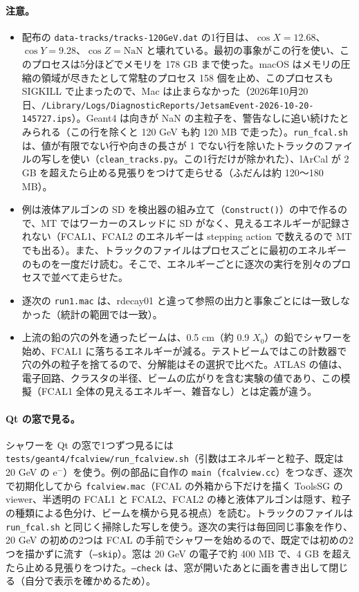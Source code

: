 \documentclass[a4paper,10pt]{ltjsarticle}
\begin{document}
\paragraph{注意。}
\begin{itemize}
\item 配布の \texttt{data-tracks/tracks-120GeV.dat} の1行目は、$\cos X=12.68$、$\cos Y=9.28$、$\cos Z=\mathrm{NaN}$ と壊れている。最初の事象がこの行を使い、このプロセスは5分ほどでメモリを 178 GB まで使った。macOS はメモリの圧縮の領域が尽きたとして常駐のプロセス 158 個を止め、このプロセスも SIGKILL で止まったので、Mac は止まらなかった（2026年10月20日、\nolinkurl{/Library/Logs/DiagnosticReports/JetsamEvent-2026-10-20-145727.ips}）。Geant4 は向きが NaN の主粒子を、警告なしに追い続けたとみられる（この行を除くと 120 GeV も約 120 MB で走った）。\texttt{run\_fcal.sh} は、値が有限でない行や向きの長さが 1 でない行を除いたトラックのファイルの写しを使い（\texttt{clean\_tracks.py}。この1行だけが除かれた）、lArCal が 2 GB を超えたら止める見張りをつけて走らせる（ふだんは約 120〜180 MB）。
\item 例は液体アルゴンの SD を検出器の組み立て（\texttt{Construct()}）の中で作るので、MT ではワーカーのスレッドに SD がなく、見えるエネルギーが記録されない（FCAL1、FCAL2 のエネルギーは stepping action で数えるので MT でも出る）。また、トラックのファイルはプロセスごとに最初のエネルギーのものを一度だけ読む。そこで、エネルギーごとに逐次の実行を別々のプロセスで並べて走らせた。
\item 逐次の \texttt{run1.mac} は、rdecay01 と違って参照の出力と事象ごとには一致しなかった（統計の範囲では一致）。
\item 上流の鉛の穴の外を通ったビームは、0.5 cm（約 0.9 $X_0$）の鉛でシャワーを始め、FCAL1 に落ちるエネルギーが減る。テストビームではこの計数器で穴の外の粒子を捨てるので、分解能はその選択で比べた。ATLAS の値は、電子回路、クラスタの半径、ビームの広がりを含む実験の値であり、この模擬（FCAL1 全体の見えるエネルギー、雑音なし）とは定義が違う。
\end{itemize}

\paragraph{Qt の窓で見る。}シャワーを Qt の窓で1つずつ見るには \nolinkurl{tests/geant4/fcalview/run_fcalview.sh}（引数はエネルギーと粒子、既定は 20 GeV の e$^-$）を使う。例の部品に自作の \texttt{main}（\texttt{fcalview.cc}）をつなぎ、逐次で初期化してから \texttt{fcalview.mac}（FCAL の外箱から下だけを描く ToolsSG の viewer、半透明の FCAL1 と FCAL2、FCAL2 の棒と液体アルゴンは隠す、粒子の種類による色分け、ビームを横から見る視点）を読む。トラックのファイルは \texttt{run\_fcal.sh} と同じく掃除した写しを使う。逐次の実行は毎回同じ事象を作り、20 GeV の初めの2つは FCAL の手前でシャワーを始めるので、既定では初めの2つを描かずに流す（\texttt{--skip}）。窓は 20 GeV の電子で約 400 MB で、4 GB を超えたら止める見張りをつけた。\texttt{--check} は、窓が開いたあとに画を書き出して閉じる（自分で表示を確かめるため）。
\end{document}
